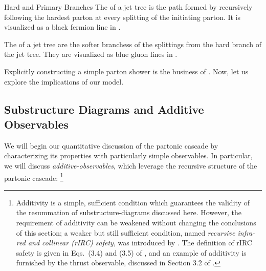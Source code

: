 \begin{definitionbox}{Hard and Primary Branches}{}
    The  of a jet tree is the path formed by recursively following the hardest parton at every splitting of the initiating parton.
    It is visualized as a black fermion line in .

    The  of a jet tree are the softer branchess of the splittings from the hard branch of the jet tree.
    They are visualized as blue gluon lines in .
\end{definitionbox}

Explicitly constructing a simple parton shower is the business of .
%
Now, let us explore the implications of our model.


\subsection{Substructure Diagrams and Additive Observables}
\label{sec:ll-substructure-diagrams}

We will begin our quantitative discussion of the partonic cascade by characterizing its properties with particularly simple observables.
%
In particular, we will discuss \emph{\glspl{additive-observable}}, which leverage the recursive structure of the partonic cascade:%
\footnote{
    Additivity is a simple, sufficient condition which guarantees the validity of the resummation of \glspl{substructure-diagram} discussed here.
    However, the requirement of additivity can be weakened without changing the conclusions of this section;
    a weaker but still sufficient condition, named \textit{recursive infra-red and collinear (rIRC) safety}, was introduced by .
    The definition of rIRC safety is given in Eqs.\ (3.4) and (3.5) of , and an example of additivity is furnished by the thrust observable, discussed in Section 3.2 of .
}

